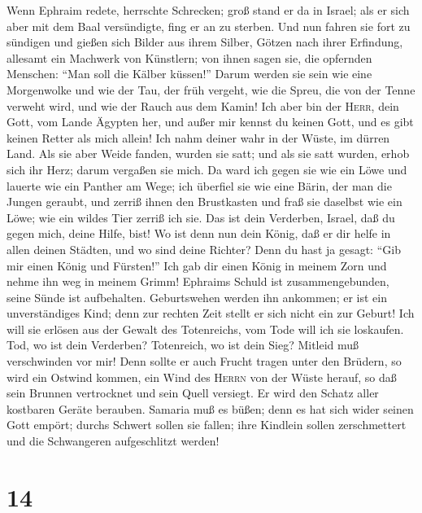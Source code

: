 Wenn Ephraim redete, herrschte Schrecken; groß stand er
da in Israel; als er sich aber mit dem Baal versündigte, fing er an zu
sterben.  Und nun fahren sie fort zu sündigen und gießen
sich Bilder aus ihrem Silber, Götzen nach ihrer Erfindung, allesamt ein
Machwerk von Künstlern; von ihnen sagen sie, die opfernden Menschen:
``Man soll die Kälber küssen!''  Darum werden sie sein wie
eine Morgenwolke und wie der Tau, der früh vergeht, wie die Spreu, die
von der Tenne verweht wird, und wie der Rauch aus dem Kamin!
 Ich aber bin der \textsc{Herr}, dein Gott, vom Lande
Ägypten her, und außer mir kennst du keinen Gott, und es gibt keinen
Retter als mich allein!  Ich nahm deiner wahr in der
Wüste, im dürren Land.  Als sie aber Weide fanden, wurden
sie satt; und als sie satt wurden, erhob sich ihr Herz; darum vergaßen
sie mich.  Da ward ich gegen sie wie ein Löwe und lauerte
wie ein Panther am Wege;  ich überfiel sie wie eine Bärin,
der man die Jungen geraubt, und zerriß ihnen den Brustkasten und fraß
sie daselbst wie ein Löwe; wie ein wildes Tier zerriß ich sie.
 Das ist dein Verderben, Israel, daß du gegen mich, deine
Hilfe, bist!  Wo ist denn nun dein König, daß er dir
helfe in allen deinen Städten, und wo sind deine Richter? Denn du hast
ja gesagt: ``Gib mir einen König und Fürsten!''  Ich gab
dir einen König in meinem Zorn und nehme ihn weg in meinem Grimm!
 Ephraims Schuld ist zusammengebunden, seine Sünde ist
aufbehalten.  Geburtswehen werden ihn ankommen; er ist
ein unverständiges Kind; denn zur rechten Zeit stellt er sich nicht ein
zur Geburt!  Ich will sie erlösen aus der Gewalt des
Totenreichs, vom Tode will ich sie loskaufen. Tod, wo ist dein
Verderben? Totenreich, wo ist dein Sieg? Mitleid muß verschwinden vor
mir!  Denn sollte er auch Frucht tragen unter den
Brüdern, so wird ein Ostwind kommen, ein Wind des \textsc{Herrn} von der
Wüste herauf, so daß sein Brunnen vertrocknet und sein Quell versiegt.
Er wird den Schatz aller kostbaren Geräte berauben. 
Samaria muß es büßen; denn es hat sich wider seinen Gott empört; durchs
Schwert sollen sie fallen; ihre Kindlein sollen zerschmettert und die
Schwangeren aufgeschlitzt werden!

\hypertarget{section-13}{%
\section{14}\label{section-13}}

